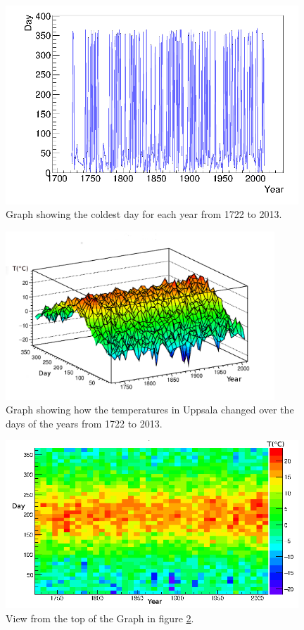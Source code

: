 \begin{figure}[H]
\begin{center}
\includegraphics[width=11cm]{graph1D.png}
\caption{Graph showing the coldest day for each year from 1722 to 2013.}
\label{fig:ColdGraph}
\end{center}
\end{figure}

\begin{figure}[H]
\begin{center}
\includegraphics[width=0.9\textwidth]{2Dgraph1.png}
\caption{Graph showing how the temperatures in Uppsala changed over the days of the years from 1722 to 2013.}
\label{fig:3D}
\end{center}
\end{figure}

\begin{figure}[H]
\begin{center}
\includegraphics[width=11cm]{2Dgraphint.png}
\caption{View from the top of the Graph in figure \ref{fig:3D}.}
\label{fig:top3D}
\end{center}
\end{figure}


